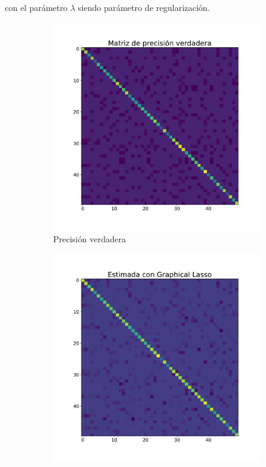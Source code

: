 \documentclass{article}
\begin{document}
con el parámetro $\lambda$ siendo parámetro de regularización. 
\begin{figure}[htb]
    \centering
    \begin{subfigure}[t]{0.32\linewidth}
        \centering
        \includegraphics[width=\textwidth]{imagenes/graphical_lasso/true_precision_sample.pdf}
        \caption{Precisión verdadera}
        \label{fig:graphical_lasso_true_precision}
    \end{subfigure}\hfill
    \begin{subfigure}[t]{0.32\linewidth}
        \centering
        \includegraphics[width=\textwidth]{imagenes/graphical_lasso/graphical_sample.pdf}

\end{subfigure}
\end{figure}
\end{document}
